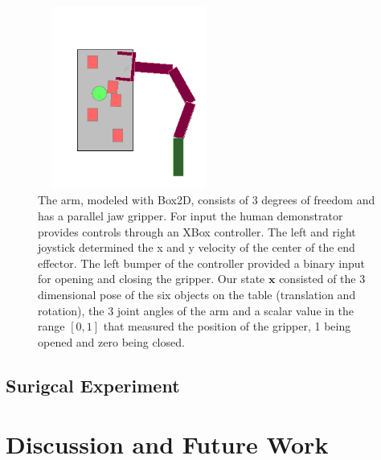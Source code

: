 \documentclass[10pt, conference]{ieeeconf}      %
\newcommand{\bx}{\mathbf{x}}
\begin{document}
\begin{figure}[t!]
\centering
\includegraphics[width=6cm, height=6cm]{figures/box2D_arm.png}
\caption{  The arm, modeled with Box2D, consists of 3 degrees of freedom and has a parallel jaw gripper. For input the human demonstrator provides controls through an XBox controller. The left and right joystick determined the x and y velocity of the center of the end effector. The left bumper of the controller provided a binary input for opening and closing the gripper. Our state $\bx$ consisted of the 3 dimensional pose of the six objects on the table (translation and rotation), the 3 joint angles of the arm and a scalar value in the range $[0,1]$ that measured the position of the gripper, 1 being opened and zero being closed. }

\vspace*{-10pt}
\label{fig:box2D_arm.png}
\end{figure}



\subsection{Surigcal Experiment}



\section{Discussion and Future Work}




\end{document}
